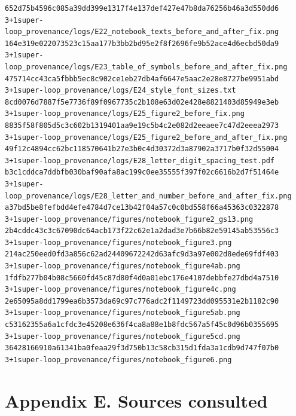 \documentclass[
  10pt,
]{article}
\begin{document}
\begin{verbatim}
652d75b4596c085a39dd399e1317f4e137def427e47b8da76256b46a3d550dd6  3+1super-loop_provenance/logs/E22_notebook_texts_before_and_after_fix.png
164e319e022073523c15aa177b3bb2bd95e2f8f2696fe9b52ace4d6ecbd50da9  3+1super-loop_provenance/logs/E23_table_of_symbols_before_and_after_fix.png
475714cc43ca5fbbb5ec8c902ce1eb27db4af6647e5aac2e28e8727be9951abd  3+1super-loop_provenance/logs/E24_style_font_sizes.txt
8cd0076d7887f5e7736f89f0967735c2b108e63d02e428e8821403d85949e3eb  3+1super-loop_provenance/logs/E25_figure2_before_fix.png
8835f58f805d5c3c602b1319401aa9e19c5b4c2e082d2eeaee7c47d2eeea2973  3+1super-loop_provenance/logs/E25_figure2_before_and_after_fix.png
49f12c4894cc62bc118570641b27e3b0c4d30372d3a87902a3717b0f32d55004  3+1super-loop_provenance/logs/E28_letter_digit_spacing_test.pdf
b3c1cddca7ddbfb030baf90afa8ac199c0ee35555f397f02c6616b2d7f51464e  3+1super-loop_provenance/logs/E28_letter_and_number_before_and_after_fix.png
a37bd5be8fefbdd4efe4784d7ce13b42f04a57c0c0bd558f66a45363c0322878  3+1super-loop_provenance/figures/notebook_figure2_gs13.png
2b4cddc43c3c67090dc64acb173f22c62e1a2dad3e7b66b82e59145ab53556c3  3+1super-loop_provenance/figures/notebook_figure3.png
214ac250eed0fd3a856c62ad24409672242d63afc9d3a97e002d8ede69fdf403  3+1super-loop_provenance/figures/notebook_figure4ab.png
1fdfb277b04b08c5660fd45c87d80f4d0a01ebc176e4107debbfe27dbd4a7510  3+1super-loop_provenance/figures/notebook_figure4c.png
2e65095a8dd1799ea6b3573da69c97c776adc2f1149723dd095531e2b1182c90  3+1super-loop_provenance/figures/notebook_figure5ab.png
c53162355a6a1cfdc3e45208e636f4ca8a88e1b8fdc567a5f45c0d96b0355695  3+1super-loop_provenance/figures/notebook_figure5cd.png
36428166910a61341ba0feaa29f3d750b13c58cb315d1fda3a1cdb9d747f07b0  3+1super-loop_provenance/figures/notebook_figure6.png
\end{verbatim}

\hypertarget{appendix-e.-sources-consulted}{%
\section{Appendix E. Sources
consulted}\label{appendix-e.-sources-consulted}}
\end{document}
